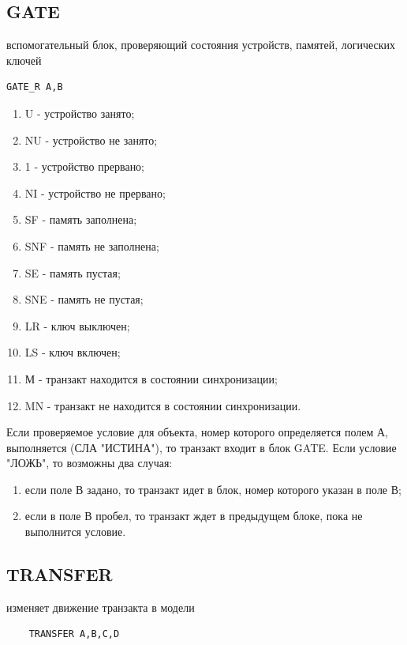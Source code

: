 \documentclass[14pt]{extarticle}
\begin{document}
\subsection*{GATE}

вспомогательный блок, проверяющий состояния устройств, памятей, логических ключей

\begin{lstlisting}
GATE_R А,В

\end{lstlisting}

\begin{enumerate}
	\item U - устройство занято;
	\item NU - устройство не занято;
	\item 1 - устройство прервано;
	\item NI - устройство не прервано;
	\item SF - память заполнена;
	\item SNF - память не заполнена;
	\item SE - память пустая;
	\item SNE - память не пустая;
	\item LR - ключ выключен;
	\item LS - ключ включен;
	\item М - транзакт находится в состоянии синхронизации;
	\item MN - транзакт не находится в состоянии синхронизации. 
\end{enumerate}

Если проверяемое условие для объекта, номер которого определяется полем А, выполняется (СЛА "ИСТИНА"), то транзакт входит в блок GATE. Если условие "ЛОЖЬ", то возможны два случая:

\begin{enumerate}
	\item если поле В задано, то транзакт идет в блок, номер которого указан в поле В;
	\item если в поле В пробел, то транзакт ждет в предыдущем блоке, пока не выполнится условие. 
\end{enumerate}


\subsection*{TRANSFER}

изменяет движение транзакта в модели

\begin{lstlisting}
	TRANSFER А,В,С,D
\end{lstlisting}
\end{document}
